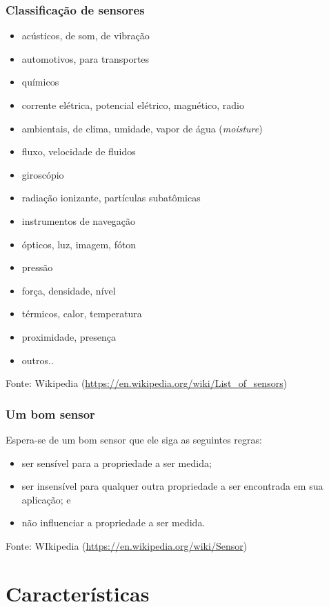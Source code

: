 \documentclass{beamer}
\begin{document}
\begin{frame}
	\frametitle{Classificação de sensores}
		\begin{itemize}
			\item acústicos, de som, de vibração
			\item automotivos, para transportes
			\item químicos
			\item corrente elétrica, potencial elétrico, magnético, radio
			\item ambientais, de clima, umidade, vapor de água (\textit{moisture})
			\item fluxo, velocidade de fluidos
			\item giroscópio
			\item radiação ionizante, partículas subatômicas
			\item instrumentos de navegação
			\item ópticos, luz, imagem, fóton
			\item pressão
			\item força, densidade, nível
			\item térmicos, calor, temperatura
			\item proximidade, presença
			\item outros..
		\end{itemize}
		{\scriptsize Fonte: Wikipedia (\url{https://en.wikipedia.org/wiki/List_of_sensors})}
\end{frame}

\begin{frame}
	\frametitle{Um bom sensor}
	Espera-se de um bom sensor que ele siga as seguintes regras:
	\begin{itemize}
		\item ser sensível para a propriedade a ser medida;
		\item ser insensível para qualquer outra propriedade  a ser encontrada em sua aplicação; e
		\item não influenciar a propriedade a ser medida.
	\end{itemize}
	{\scriptsize Fonte: WIkipedia (\url{https://en.wikipedia.org/wiki/Sensor})}
\end{frame}

\section{Características}
\end{document}
